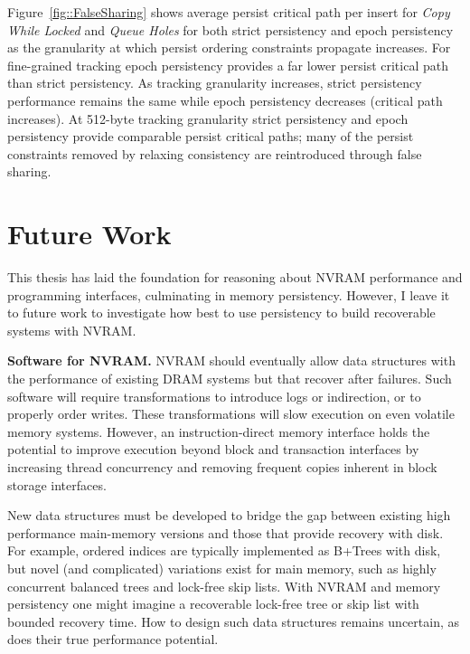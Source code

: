  

Figure~\ref{fig::FalseSharing} shows average persist critical path per insert for \emph{Copy While Locked} and \emph{Queue Holes} for both strict persistency and epoch persistency as the granularity at which persist ordering constraints propagate increases.
For fine-grained tracking epoch persistency provides a far lower persist critical path than strict persistency.
As tracking granularity increases, strict persistency performance remains the same while epoch persistency decreases (critical path increases).
At 512-byte tracking granularity strict persistency and epoch persistency provide comparable persist critical paths; many of the persist constraints removed by relaxing consistency are reintroduced through false sharing.

\section{Future Work}
\label{sec:PersistencyEval:FutureWork}

This thesis has laid the foundation for reasoning about NVRAM performance and programming interfaces, culminating in memory persistency.
However, I leave it to future work to investigate how best to use persistency to build recoverable systems with NVRAM.

\textbf{Software for NVRAM.}
NVRAM should eventually allow data structures with the performance of existing DRAM systems but that recover after failures.
Such software will require transformations to introduce logs or indirection, or to properly order writes.
These transformations will slow execution on even volatile memory systems.
However, an instruction-direct memory interface holds the potential to improve execution beyond block and transaction interfaces by increasing thread concurrency and removing frequent copies inherent in block storage interfaces.

New data structures must be developed to bridge the gap between existing high performance main-memory versions and those that provide recovery with disk.
For example, ordered indices are typically implemented as B+Trees with disk, but novel (and complicated) variations exist for main memory, such as highly concurrent balanced trees and lock-free skip lists.
With NVRAM and memory persistency one might imagine a recoverable lock-free tree or skip list with bounded recovery time.
How to design such data structures remains uncertain, as does their true performance potential.

